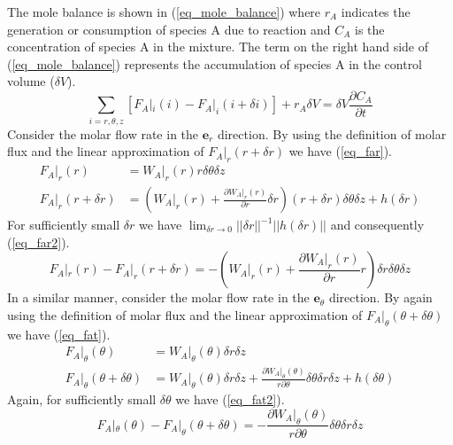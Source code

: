 \documentclass[11pt,fleqn]{article}
\theoremstyle{defstyle}
\begin{document}
The mole balance is shown in (\ref{eq_mole_balance}) where $r_A$ indicates the generation or consumption of species A due to reaction and $C_A$ is the concentration of species A in the mixture. The term on the right hand side of (\ref{eq_mole_balance}) represents the accumulation of species A in the control volume ($\delta V$).
\begin{equation}
\sum_{i=r, \theta, z}[F_A|_i(i) - F_A|_i(i+\delta i)] + r_A \delta V = \delta V \frac{\partial C_A}{\partial t}
\label{eq_mole_balance}
\end{equation}
Consider the molar flow rate in the $\mathbf{e}_r$ direction. By using the definition of molar flux and the linear approximation of $F_A|_r(r+\delta r)$ we have (\ref{eq_far}).
\begin{equation}
\begin{aligned}
F_A|_r(r) &= W_A|_r(r) r \delta \theta \delta z \\
F_A|_r(r+\delta r) &= (W_ A|_r(r) + \frac{\partial W_A|_r(r)}{\partial r} \delta r)(r+\delta r)\delta \theta \delta z + h(\delta r)
\end{aligned}
\label{eq_far}
\end{equation}
For sufficiently small $\delta r$ we have $\lim_{\delta r \to 0} ||\delta r||^{-1}||h(\delta r)||$ and consequently (\ref{eq_far2}).  
\begin{equation}
F_A|_r(r) - F_A|_r(r+\delta r)  = - (W_ A|_r(r)  + \frac{\partial W_A|_r(r)}{\partial r}r) \delta r \delta \theta \delta z
\label{eq_far2}
\end{equation}
In a similar manner, consider the molar flow rate in the $\mathbf{e}_\theta$ direction. By again using the definition of molar flux and the linear approximation of $F_A|_\theta(\theta+\delta \theta)$ we have (\ref{eq_fat}).
\begin{equation}
\begin{aligned}
F_A|_\theta(\theta) &= W_A|_\theta(\theta) \delta r \delta z \\
F_A|_\theta(\theta + \delta \theta) &= W_A|_\theta(\theta) \delta r \delta z + \frac{\partial W_A|_\theta(\theta)}{r \partial \theta}\delta \theta\delta r \delta z + h(\delta \theta)
\end{aligned}
\label{eq_fat}
\end{equation}
Again, for sufficiently small $\delta \theta$ we have (\ref{eq_fat2}).
\begin{equation}
F_A|_\theta(\theta) - F_A|_\theta(\theta + \delta \theta) =- \frac{\partial W_A|_\theta(\theta)}{r \partial \theta}\delta \theta\delta r \delta z
\label{eq_fat2} 
\end{equation}
\end{document}
